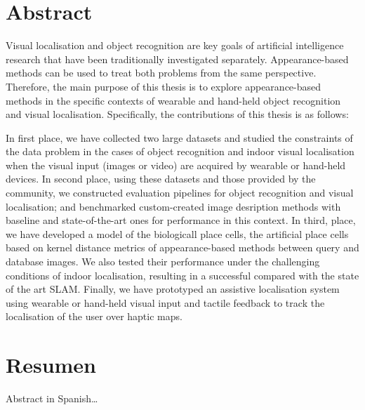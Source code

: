 \begingroup
\let\clearpage\relax
\let\cleardoublepage\relax
\let\cleardoublepage\relax

\chapter*{Abstract}

Visual localisation and object recognition are key goals of artificial intelligence research that have been traditionally investigated separately. Appearance-based methods can be used to treat both problems from the same perspective. Therefore, the main purpose of this thesis is to explore appearance-based methods in the specific contexts of wearable and hand-held object recognition and visual localisation. Specifically, the contributions of this thesis is as follows:

In first place, we have collected two large datasets and studied the constraints of the data problem in the cases of object recognition and indoor visual localisation when the visual input (images or video) are acquired by wearable or hand-held devices. In second place, using these datasets and those provided by the community, we constructed evaluation pipelines for object recognition and visual localisation; and benchmarked custom-created image desription methods with baseline and state-of-the-art ones for performance in this context. In third, place, we have developed a model of the biologicall place cells, the artificial place cells based on kernel distance metrics of appearance-based methods between query and database images. We also tested their performance under the challenging conditions of indoor localisation, resulting in a successful compared with the state of the art SLAM. Finally, we have prototyped an assistive localisation system using wearable or hand-held visual input and tactile feedback to track the localisation of the user over haptic maps.


\vfill

\chapter*{Resumen}
Abstract in Spanish\dots


\endgroup			

\vfill
